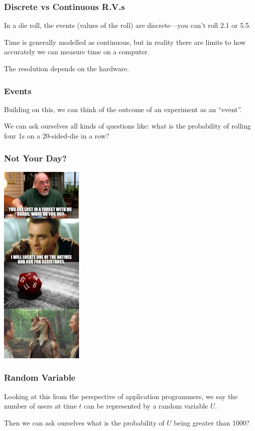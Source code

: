 \begin{frame}
\frametitle{Discrete vs Continuous R.V.s}

In a die roll, the events (values of the roll) are discrete---you can't roll 2.1 or 5.5.

Time is generally modelled as continuous, but in reality there are limits to how accurately we can measure time on a computer. 

The resolution depends on the hardware. 

\end{frame}



\begin{frame}
\frametitle{Events}

Building on this, we can think of the outcome of an experiment as an ``event''. 

We can ask ourselves all kinds of questions like: what is the probability of rolling four 1s on a 20-sided-die in a row?

\end{frame}


\begin{frame}
\frametitle{Not Your Day?}

\begin{center}
	\includegraphics[width=0.3\textwidth]{images/jarjar.jpeg}
\end{center}

\end{frame}


\begin{frame}
\frametitle{Random Variable}

Looking at this from the perspective of application programmers, we say the number of users at time $t$ can be represented by a random variable $U$. 

Then we can ask ourselves what is the probability of $U$ being greater than 1000?

\end{frame}



